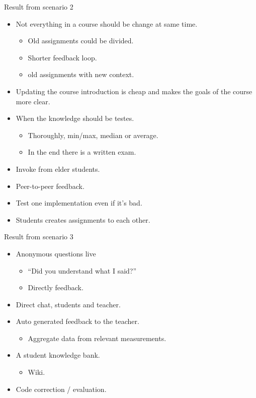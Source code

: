 Result from scenario 2
\begin{itemize}
\item Not everything in a course should be change at same time.
\begin{itemize}
\item Old assignments could be divided.
\item Shorter feedback loop.
\item old assignments with new context.
\end{itemize}
\item Updating the course introduction is cheap and makes the goals of the course more clear.
\item When the knowledge should be testes.
\begin{itemize}
\item Thoroughly, min/max, median or average.
\item In the end there is a written exam.
\end{itemize}
\item Invoke from elder students.
\item Peer-to-peer feedback.
\item Test one implementation even if it's bad.
\item Students creates assignments to each other.
\end{itemize}

Result from scenario 3
\begin{itemize}
\item Anonymous questions live
\begin{itemize}
\item ``Did you understand what I said?''
\item Directly feedback.
\end{itemize}
\item Direct chat, students and teacher.
\item Auto generated feedback to the teacher.
\begin{itemize}
\item Aggregate data from relevant measurements.
\end{itemize}
\item A student knowledge bank.
\begin{itemize}
\item Wiki.
\end{itemize}
\item Code correction / evaluation.
\end{itemize}


